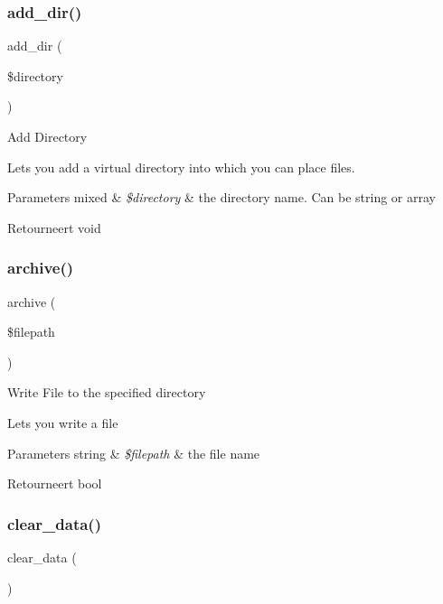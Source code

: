 \subsubsection{\texorpdfstring{add\_dir()}{add\_dir()}}
{\footnotesize\ttfamily add\+\_\+dir (\begin{DoxyParamCaption}\item[{}]{\$directory }\end{DoxyParamCaption})}

Add Directory

Lets you add a virtual directory into which you can place files.


\begin{DoxyParams}[1]{Parameters}
mixed & {\em \$directory} & the directory name. Can be string or array \\
\hline
\end{DoxyParams}
\begin{DoxyReturn}{Retourneert}
void 
\end{DoxyReturn}
\mbox{\label{class_c_i___zip_a935879d7074c751a4ac886aebd66cbd4}} 
\subsubsection{\texorpdfstring{archive()}{archive()}}
{\footnotesize\ttfamily archive (\begin{DoxyParamCaption}\item[{}]{\$filepath }\end{DoxyParamCaption})}

Write File to the specified directory

Lets you write a file


\begin{DoxyParams}[1]{Parameters}
string & {\em \$filepath} & the file name \\
\hline
\end{DoxyParams}
\begin{DoxyReturn}{Retourneert}
bool 
\end{DoxyReturn}
\mbox{\label{class_c_i___zip_a89d046bac0ab06a81c5c03d55b4bcae5}} 
\subsubsection{\texorpdfstring{clear\_data()}{clear\_data()}}
{\footnotesize\ttfamily clear\+\_\+data (\begin{DoxyParamCaption}{ }\end{DoxyParamCaption})}

